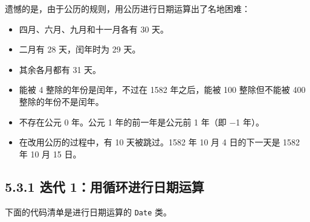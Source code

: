 遗憾的是，由于公历的规则，用公历进行日期运算出了名地困难：

\begin{itemize}
\item 四月、六月、九月和十一月各有 30 天。
\item 二月有 28 天，闰年时为 29 天。
\item 其余各月都有 31 天。
\item 能被 4 整除的年份是闰年，不过在 1582 年之后，能被 100 整除但不能被 400 整除的年份不是闰年。
\item 不存在公元 0 年。公元 1 年的前一年是公元前 1 年（即 −1 年）。
\item 在改用公历的过程中，有 10 天被跳过。1582 年 10 月 4 日的下一天是 1582 年 10 月 15 日。
\end{itemize}

\subsection{5.3.1 迭代 1：用循环进行日期运算}

下面的代码清单是进行日期运算的 \texttt{Date} 类。

